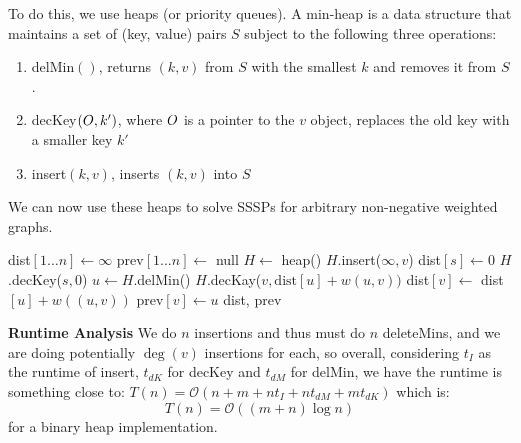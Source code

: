 To do this, we use heaps (or priority queues). A min-heap is a data structure that maintains a set of (key, value) pairs $S$ subject to the following
three operations:
\begin{enumerate}
    \item delMin$()$, returns $(k, v)$ from $S$ with the smallest $k$ and removes it from $S$.
    \item decKey$(\*O, k')$, where $\*O$ is a pointer to the $v$ object, replaces the old key with a smaller key $k'$
    \item insert$(k, v)$, inserts $(k, v)$ into $S$
\end{enumerate}

We can now use these heaps to solve SSSPs for arbitrary non-negative weighted graphs.
\begin{algothm}
    \begin{algorithmic}
            \State dist$[1\dots n] \gets \infty$
            \State prev$[1\dots n] \gets$ null
            \State $H \gets$ heap()
                \State $H$.insert($\infty, v$)
            \EndFor
            \State dist$[s] \gets 0$
            \State $H$.decKey($s, 0$)
                \State $u \gets H$.delMin()
                        \State $H$.decKay($v, \text{dist}[u] + w(u, v))$
                        \State dist$[v] \gets$ dist$[u] + w((u, v))$
                        \State prev$[v] \gets u$
                    \EndIf
                \EndFor
            \EndWhile
            \State \Return dist, prev
        \EndFunction
    \end{algorithmic}

    \textbf{Runtime Analysis}
    We do $n$ insertions and thus must do $n$ deleteMins, and we are doing potentially $\deg(v)$ insertions for each, so overall, considering $t_I$ as the runtime of insert,
    $t_{dK}$ for decKey and $t_{dM}$ for delMin, we have the runtime is something close to:
    $T(n) = \mathcal{O}(n + m + nt_I + nt_{dM} + mt_{dK})$ which is:
    \[ T(n)  = \mathcal{O}((m + n) \log n) \]
    for a binary heap implementation.
\end{algothm}
